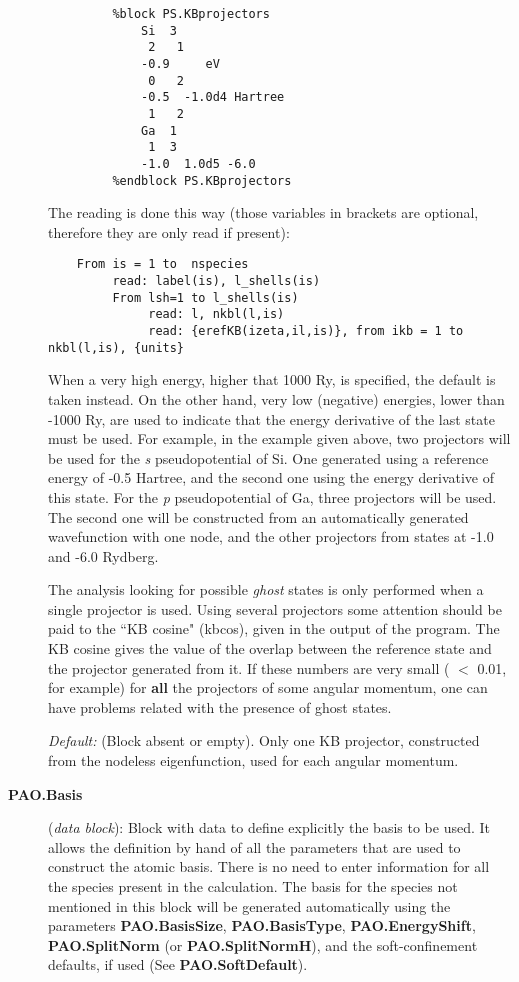 \documentclass[11pt]{article}
\begin{document}
\begin{description}
\begin{verbatim}
         %block PS.KBprojectors
             Si  3
              2   1 
             -0.9     eV
              0   2
             -0.5  -1.0d4 Hartree
              1   2
             Ga  1
              1  3
             -1.0  1.0d5 -6.0
         %endblock PS.KBprojectors
\end{verbatim}

The reading is done this way (those variables in brackets are optional,
therefore they are only read if
present):

\begin{verbatim}
    From is = 1 to  nspecies
         read: label(is), l_shells(is)
         From lsh=1 to l_shells(is)
              read: l, nkbl(l,is)
              read: {erefKB(izeta,il,is)}, from ikb = 1 to nkbl(l,is), {units}
\end{verbatim}

When a very high energy, higher that 1000 Ry, is specified, the
default is taken instead.  On the other hand, very low (negative)
energies, lower than -1000 Ry, are used to indicate that the energy
derivative of the last state must be used. For example, in the example
given above, two projectors will be used for the {\it s}
pseudopotential of Si. One generated using a reference energy of -0.5
Hartree, and the second one using the energy derivative of this
state. For the {\it p} pseudopotential of Ga, three projectors will be
used.  The second one will be constructed from an automatically
generated wavefunction with one node, and the other projectors from
states at -1.0 and -6.0 Rydberg.

The analysis looking for possible {\it ghost} states is only performed
when a single projector is used.  Using several projectors some
attention should be paid to the ``KB cosine" (kbcos), given in the
output of the program.  The KB cosine gives the value of the overlap
between the reference state and the projector generated from it.  If
these numbers are very small ( $<$ 0.01, for example) for {\bf all}
the projectors of some angular momentum, one can have problems related
with the presence of ghost states.

{\it Default:} (Block absent or empty). Only one KB projector,
constructed from the nodeless eigenfunction, used for each angular
momentum.
\noindent

     
\item[{\bf PAO.Basis}] ({\it data block}):  
Block with data to define explicitly the
basis to be used.  It allows the definition by hand of all the
parameters that are used to construct the atomic basis. There is no
need to enter information for all the species present in the
calculation. The basis for the species not mentioned in
this block will be generated automatically using the parameters {\bf
PAO.BasisSize}, {\bf PAO.BasisType}, {\bf PAO.EnergyShift}, {\bf
PAO.SplitNorm} (or {\bf PAO.SplitNormH}), and the soft-confinement
defaults, if used (See {\bf PAO.SoftDefault}). 


\end{description}
\end{document}
